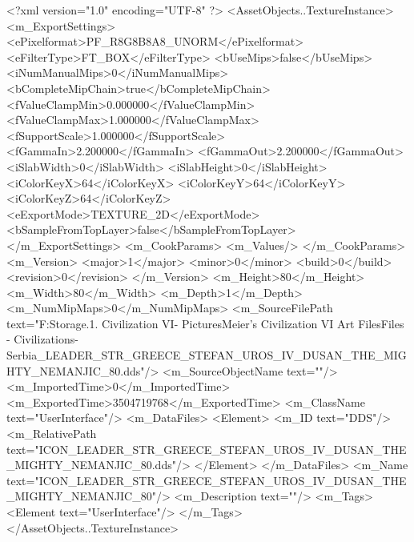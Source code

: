 <?xml version="1.0" encoding="UTF-8" ?>
<AssetObjects..TextureInstance>
	<m_ExportSettings>
		<ePixelformat>PF_R8G8B8A8_UNORM</ePixelformat>
		<eFilterType>FT_BOX</eFilterType>
		<bUseMips>false</bUseMips>
		<iNumManualMips>0</iNumManualMips>
		<bCompleteMipChain>true</bCompleteMipChain>
		<fValueClampMin>0.000000</fValueClampMin>
		<fValueClampMax>1.000000</fValueClampMax>
		<fSupportScale>1.000000</fSupportScale>
		<fGammaIn>2.200000</fGammaIn>
		<fGammaOut>2.200000</fGammaOut>
		<iSlabWidth>0</iSlabWidth>
		<iSlabHeight>0</iSlabHeight>
		<iColorKeyX>64</iColorKeyX>
		<iColorKeyY>64</iColorKeyY>
		<iColorKeyZ>64</iColorKeyZ>
		<eExportMode>TEXTURE_2D</eExportMode>
		<bSampleFromTopLayer>false</bSampleFromTopLayer>
	</m_ExportSettings>
	<m_CookParams>
		<m_Values/>
	</m_CookParams>
	<m_Version>
		<major>1</major>
		<minor>0</minor>
		<build>0</build>
		<revision>0</revision>
	</m_Version>
	<m_Height>80</m_Height>
	<m_Width>80</m_Width>
	<m_Depth>1</m_Depth>
	<m_NumMipMaps>0</m_NumMipMaps>
	<m_SourceFilePath text="F:\Mod Storage\2.1. Civilization VI\Mods\Archive - Pictures\Sid Meier's Civilization VI Art Files\Art Files - Civilizations\Civilization - Serbia\ICON_LEADER_STR_GREECE_STEFAN_UROS_IV_DUSAN_THE_MIGHTY_NEMANJIC_80.dds"/>
	<m_SourceObjectName text=""/>
	<m_ImportedTime>0</m_ImportedTime>
	<m_ExportedTime>3504719768</m_ExportedTime>
	<m_ClassName text="UserInterface"/>
	<m_DataFiles>
		<Element>
			<m_ID text="DDS"/>
			<m_RelativePath text="ICON_LEADER_STR_GREECE_STEFAN_UROS_IV_DUSAN_THE_MIGHTY_NEMANJIC_80.dds"/>
		</Element>
	</m_DataFiles>
	<m_Name text="ICON_LEADER_STR_GREECE_STEFAN_UROS_IV_DUSAN_THE_MIGHTY_NEMANJIC_80"/>
	<m_Description text=""/>
	<m_Tags>
		<Element text="UserInterface"/>
	</m_Tags>
</AssetObjects..TextureInstance>

